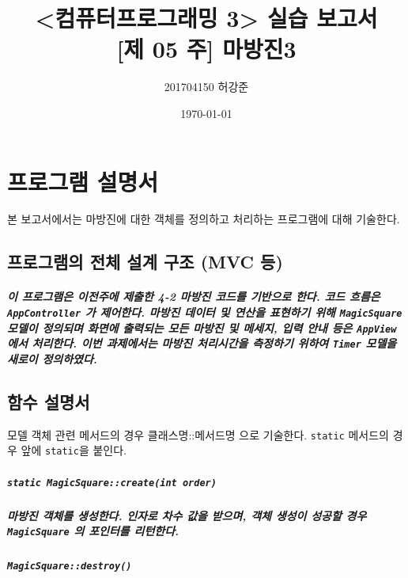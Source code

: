 \documentclass[UTF8]{report}
\title{%
    <컴퓨터프로그래밍 3> 실습 보고서 \\ 
    \large [제 05 주] 마방진3}
\author{201704150 허강준}
\date{\today}
\begin{document}
    \maketitle
    \tableofcontents

    \chapter{프로그램 설명서}
        본 보고서에서는 마방진에 대한 객체를 정의하고 처리하는 프로그램에 대해 기술한다.

        \section{프로그램의 전체 설계 구조 (MVC 등)}
            
            \paragraph{%
                \normalfont 이 프로그램은 이전주에 제출한 4-2 마방진 코드를 기반으로 한다. 코드 흐름은 \texttt{AppController} 가 제어한다. 마방진 데이터 및 연산을 표현하기 위해 \texttt{MagicSquare} 모델이 정의되며 화면에 출력되는 모든 마방진 및 메세지, 입력 안내 등은 \texttt{AppView} 에서 처리한다. 이번 과제에서는 마방진 처리시간을 측정하기 위하여 \texttt{Timer} 모델을 새로이 정의하였다.
            }

            
        \section{함수 설명서}

            모델 객체 관련 메서드의 경우 클래스명::메서드명 으로 기술한다. \texttt{static} 메서드의 경우 앞에 \texttt{static}을 붙인다.
            
            \paragraph{\texttt{static MagicSquare::create(int order)}}
            \paragraph{%
                \normalfont 마방진 객체를 생성한다. 인자로 차수 값을 받으며, 객체 생성이 성공할 경우 \texttt{MagicSquare} 의 포인터를 리턴한다.
            }

            \paragraph{\texttt{MagicSquare::destroy()}}
\end{document}
